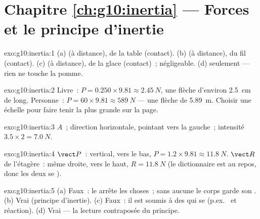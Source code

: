 \section*{Chapitre \ref{ch:g10:inertia} --- Forces et le principe d'inertie}

\begin{solution}{exo:g10:inertia:1}
(a)  (à distance),  de la table
(contact). (b)  (à distance),  du fil
(contact). (c)  (à distance), 
de la glace (contact)~;  négligeable.
(d)  seulement --- rien ne touche la pomme.
\end{solution}

\begin{solution}{exo:g10:inertia:2}
Livre~: $P = 0.250 \times 9.81 \approx \qty{2.45}{N}$, une flèche
d'environ \qty{2.5}{cm} de long. Personne~:
$P = 60 \times 9.81 \approx \qty{589}{N}$ --- une flèche de
\qty{5.89}{m}. Choisir une échelle pour faire tenir la plus grande
 sur la page.
\end{solution}

\begin{solution}{exo:g10:inertia:3}
 $A$~; direction horizontale, pointant vers
la gauche~; intensité $3.5 \times 2 = \qty{7.0}{N}$.
\end{solution}

\begin{solution}{exo:g10:inertia:4}
 $\vect P$~: vertical, vers le bas,
$P = 1.2 \times 9.81 \approx \qty{11.8}{N}$.  $\vect R$ de l'étagère~: même droite, vers le haut,
$R = \qty{11.8}{N}$ (le dictionnaire est au repos, donc les deux se
).
\end{solution}

\begin{solution}{exo:g10:inertia:5}
(a) Faux~: le  arrête les choses~; sans aucune
 le corps garde son . (b) Vrai (principe d'inertie). (c) Faux~: il est soumis à
des  qui se \emph{}
(p.ex.\  et réaction). (d) Vrai --- la lecture
contraposée du principe.
\end{solution}

